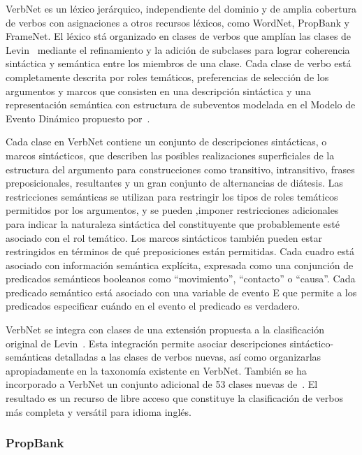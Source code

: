 VerbNet es un léxico jerárquico, independiente del dominio y de amplia cobertura de verbos con asignaciones a otros recursos léxicos, como WordNet, PropBank y FrameNet.
El léxico stá organizado en clases de verbos que amplían las clases de Levin~\cite{levin1993} mediante el refinamiento y la adición de subclases para lograr coherencia sintáctica y semántica entre los miembros de una clase.
Cada clase de verbo está completamente descrita por roles temáticos, preferencias de selección de los argumentos y marcos que consisten en una descripción sintáctica y una representación semántica con estructura de subeventos modelada en el Modelo de Evento Dinámico propuesto por~\citet{pustejovsky2013}.

Cada clase en VerbNet contiene un conjunto de descripciones sintácticas, o marcos sintácticos, que describen las posibles realizaciones superficiales de la estructura del argumento para construcciones como transitivo, intransitivo, frases preposicionales, resultantes y un gran conjunto de alternancias de diátesis.
Las restricciones semánticas se utilizan para restringir los tipos de roles temáticos permitidos por los argumentos, y se pueden ,imponer restricciones adicionales para indicar la naturaleza sintáctica del constituyente que probablemente esté asociado con el rol temático.
Los marcos sintácticos también pueden estar restringidos en términos de qué preposiciones están permitidas.
Cada cuadro está asociado con información semántica explícita, expresada como una conjunción de predicados semánticos booleanos como ``movimiento'', ``contacto'' o ``causa''.
Cada predicado semántico está asociado con una variable de evento E que permite a los predicados especificar cuándo en el evento el predicado es verdadero.

VerbNet se integra con clases de una extensión propuesta a la clasificación original de Levin~\cite{Kipper2006}.
Esta integración permite asociar descripciones sintáctico-semánticas detalladas a las clases de verbos nuevas, así como organizarlas apropiadamente en la taxonomía existente en VerbNet.
También se ha incorporado a VerbNet un conjunto adicional de 53 clases nuevas de~\citet{Korhonen2005}.
El resultado es un recurso de libre acceso que constituye la clasificación de verbos más completa y versátil para idioma inglés.

\subsubsection*{PropBank}


